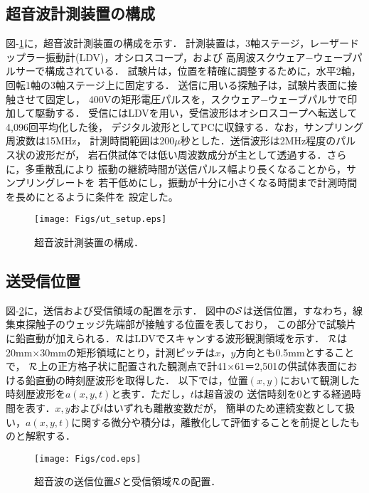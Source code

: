 \subsection{超音波計測装置の構成}
図-\ref{fig:fig3}に，超音波計測装置の構成を示す．
計測装置は，3軸ステージ，レーザードップラー振動計(LDV)，オシロスコープ，および
高周波スクウェア−ウェーブパルサーで構成されている．
試験片は，位置を精確に調整するために，水平2軸，回転1軸の3軸ステージ上に固定する．
送信に用いる探触子は，試験片表面に接触させて固定し，
400Vの矩形電圧パルスを，スクウェア−ウェーブパルサで印加して駆動する．
受信にはLDVを用い，受信波形はオシロスコープへ転送して4,096回平均化した後，
デジタル波形としてPCに収録する．なお，サンプリング周波数は15MHz，
計測時間範囲は200$\mu$秒とした．送信波形は2MHz程度のパルス状の波形だが，
岩石供試体では低い周波数成分が主として透過する．さらに，多重散乱により
振動の継続時間が送信パルス幅より長くなることから，サンプリングレートを
若干低めにし，振動が十分に小さくなる時間まで計測時間を長めにとるように条件を
設定した。
\begin{figure}[t]
\begin{center}
\texttt{[image: Figs/ut\_setup.eps]}
\caption{
	超音波計測装置の構成．
}
\label{fig:fig3}
\end{center}
\end{figure}
\subsection{送受信位置}
図-\ref{fig:fig4}に，送信および受信領域の配置を示す．
図中の${\cal S}$は送信位置，すなわち，線集束探触子のウェッジ先端部が接触する位置を表しており，
この部分で試験片に鉛直動が加えられる．${\cal R}$はLDVでスキャンする波形観測領域を示す．
$\cal R$は20mm$\times$30mmの矩形領域にとり，計測ピッチは$x$，$y$方向とも0.5mmとすることで，
$\cal R$上の正方格子状に配置された観測点で計41×61＝2,501の供試体表面における鉛直動の時刻歴波形を取得した．
以下では，位置$(x,y)$において観測した時刻歴波形を$a(x,y,t)$と表す．ただし，$t$は超音波の
送信時刻を0とする経過時間を表す．$x,y$および$t$はいずれも離散変数だが，
簡単のため連続変数として扱い，$a(x,y,t)$に関する微分や積分は，離散化して評価することを前提としたものと解釈する．
\begin{figure}[t]
\begin{center}
\texttt{[image: Figs/cod.eps]}
\caption{
	超音波の送信位置$\cal S$と受信領域$\cal R$の配置．
}
\label{fig:fig4}
\end{center}
\end{figure}
